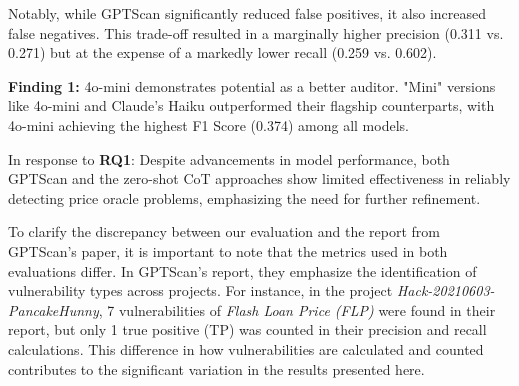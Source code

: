 Notably, while GPTScan significantly reduced false positives, it also increased false negatives. This trade-off resulted in a marginally higher precision (0.311 vs. 0.271) but at the expense of a markedly lower recall (0.259 vs. 0.602).



\begin{tcolorbox}[colback=gray!20!white, colframe=gray!75!black, boxsep=5pt, arc=4pt, boxrule=1pt, left=0pt, right=0pt]
\textbf{Finding 1:}
4o-mini demonstrates potential as a better auditor. "Mini" versions like 4o-mini and Claude's Haiku outperformed their flagship counterparts, with 4o-mini achieving the highest F1 Score (0.374) among all models. 
\end{tcolorbox}

\begin{tcolorbox}[colback=gray!20!white, colframe=gray!75!black, boxsep=5pt, arc=4pt, boxrule=1pt, left=0pt, right=0pt]
In response to \textbf{RQ1}: Despite advancements in model performance, both GPTScan and the zero-shot CoT approaches show limited effectiveness in reliably detecting price oracle problems, emphasizing the need for further refinement.
\end{tcolorbox}


To clarify the discrepancy between our evaluation and the report from GPTScan's paper, it is important to note that the metrics used in both evaluations differ. In GPTScan's report, they emphasize the identification of vulnerability types across projects.
For instance, in the project \textit{Hack-20210603-PancakeHunny}, 7 vulnerabilities of \textit{Flash Loan Price (FLP)} were found in their report, but only 1 true positive (TP) was counted in their precision and recall calculations. This difference in how vulnerabilities are calculated and counted contributes to the significant variation in the results presented here.


